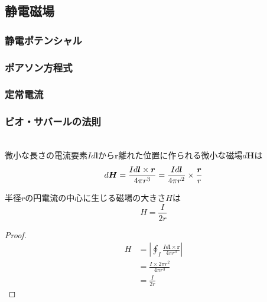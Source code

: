\documentclass[dvipdfmx,uplatex]{jsarticle}
\begin{document}
\subsection{静電磁場}

\subsubsection{静電ポテンシャル}

\subsubsection{ポアソン方程式}

\subsubsection{定常電流}

\subsubsection{ビオ・サバールの法則}
\begin{law}[ビオ・サバールの法則] \mbox{} \\
微小な長さの電流要素$I d\bm{l} $から$ \bm{r} $離れた位置に作られる微小な磁場$ d\bm{H} $は
\[
d\bm{H} = \frac{Id\bm{l} \times \bm{r}}{4 \pi r^3} = \frac{Id\bm{l}}{4 \pi r^2} \times \frac{\bm{r}}{r} \\
\]
\end{law}
\begin{theo}
半径$r$の円電流の中心に生じる磁場の大きさ$H$は
\[
H = \frac{I}{2r}
\]
\end{theo}
\begin{proof}
\begin{align*}
H &= \left| \oint_I \frac{Id\bm{l} \times \bm{r}}{4 \pi r^3} \right| \\
&= \frac{I \times 2 \pi r^2}{4 \pi r^3} \\
&= \frac{I}{2r}
\end{align*}
\end{proof}

\newpage
\end{document}
